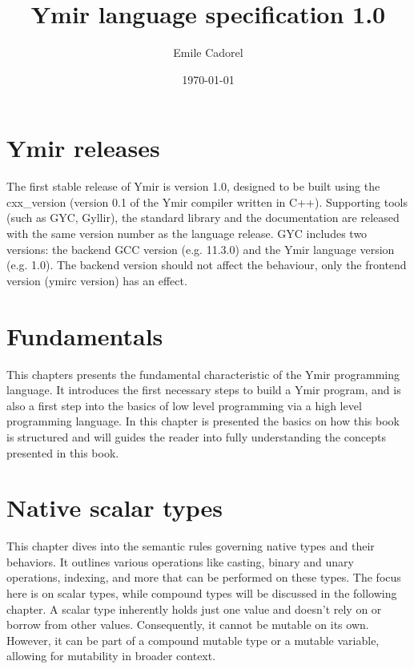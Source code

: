 \documentclass[twoside,a4paper,11pt]{book}
\author{Emile Cadorel}
\date{\today}
\title{Ymir language specification 1.0}
\begin{document}
\setlength{\aweboxleftmargin}{0.05\linewidth}
\setlength{\aweboxcontentwidth}{0.93\linewidth}


\maketitle
\dominitoc
\dominilof
\dominilot

\chapter*{Ymir releases}

The first stable release of Ymir is version 1.0, designed to be built using the
cxx\_version (version 0.1 of the Ymir compiler written in C++). Supporting tools
(such as GYC, Gyllir), the standard library and the documentation are released
with the same version number as the language release. GYC includes two versions:
the backend GCC version (e.g. 11.3.0) and the Ymir language version (e.g. 1.0).
The backend version should not affect the behaviour, only the frontend version
(ymirc version) has an effect.

\begin{multicols*}{2}
  \tableofcontents
\end{multicols*}

\chapter{Fundamentals}
This chapters presents the fundamental characteristic of the Ymir programming
language. It introduces the first necessary steps to build a Ymir program, and
is also a first step into the basics of low level programming via a high level
programming language. In this chapter is presented the basics on how this book
is structured and will guides the reader into fully understanding the concepts
presented in this book.

\begin{multicols*}{2}
  \minitoc%
  
\end{multicols*}

\chapter{Native scalar types}

This chapter dives into the semantic rules governing native types and their
behaviors. It outlines various operations like casting, binary and unary
operations, indexing, and more that can be performed on these types. The focus
here is on scalar types, while compound types will be discussed in the following
chapter. A scalar type inherently holds just one value and doesn't rely on or
borrow from other values. Consequently, it cannot be mutable on its own.
However, it can be part of a compound mutable type or a mutable variable,
allowing for mutability in broader context.
\end{document}
